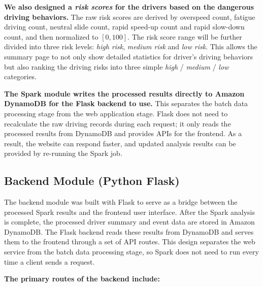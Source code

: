 \documentclass[12pt,a4paper]{article}
\begin{document}
\textbf{We also designed a \textit{risk scores} for the drivers based on the dangerous driving behaviors.} The raw risk scores are derived by overspeed count, fatigue driving count, neutral slide count, rapid speed-up count and rapid slow-down count, and then normalized to $[0,100]$. The risk score range will be further divided into three risk levels: \textit{high risk}, \textit{medium risk} and \textit{low risk}. This allows the summary page to not only show detailed statistics for driver's driving behaviors but also ranking the driving risks into three simple \textit{high} / \textit{medium} / \textit{low} categories.

\textbf{The Spark module writes the processed results directly to Amazon DynamoDB for the Flask backend to use.} This separates the batch data processing stage from the web application stage. Flask does not need to recalculate the raw driving records during each request; it only reads the processed results from DynamoDB and provides APIs for the frontend. As a result, the website can respond faster, and updated analysis results can be provided by re-running the Spark job.

\subsection{Backend Module (Python Flask)}

The backend module was built with Flask to serve as a bridge between the processed Spark results and the frontend user interface. After the Spark analysis is complete, the processed driver summary and event data are stored in Amazon DynamoDB. The Flask backend reads these results from DynamoDB and serves them to the frontend through a set of API routes. This design separates the web service from the batch data processing stage, so Spark does not need to run every time a client sends a request.

\textbf{The primary routes of the backend include:}
\end{document}
